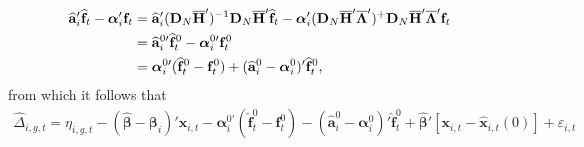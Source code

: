 \documentclass[12pt,fleqn]{article}
\def\*#1{\mathbf{#1}}
\def\+#1{\boldsymbol{#1}}
\begin{document}
\begin{align}
\widehat{\*a}_i'\widehat{\*f}_t - \+\alpha_i'\*f_t &= \widehat{\*a}_i'(\*{D}_N\overline{\*{H}}')^{-1}\*{D}_N\overline{\*{H}}'\widehat{\*f}_t - \+\alpha_i'(\mathbf{D}_N\overline{\mathbf{H}}'\overline{\boldsymbol{\Lambda}}')^+\mathbf{D}_N\overline{\mathbf{H}}'\overline{\boldsymbol{\Lambda}}'\*f_t \notag\\
& = \widehat{\*a}_i^{0\prime}\widehat{\*f}_t^0 - \+\alpha_i^{0\prime}\*f_t^0 \notag\\
& = \+\alpha_i^{0\prime}(\widehat{\*f}_t^0-\*f_t^0) + (\widehat{\*a}_i^{0} - \+\alpha_i^0)'\widehat{\*f}_t^0,
\end{align}
from which it follows that
\begin{align}
\widehat \Delta_{i,g,t}  = \eta_{i,g,t} - (\widehat{\+\beta} - \+\beta_i)'\*x_{i,t}  - \+\alpha_i^{0\prime}(\widehat{\*f}_t^0-\*f_t^0) - (\widehat{\*a}_i^{0} - \+\alpha_i^0)'\widehat{\*f}_t^0  + \widehat{\+\beta}'[\*x_{i,t} - \widehat{\*x}_{i,t}(0)] + \varepsilon_{i,t}
\end{align}
\end{document}
